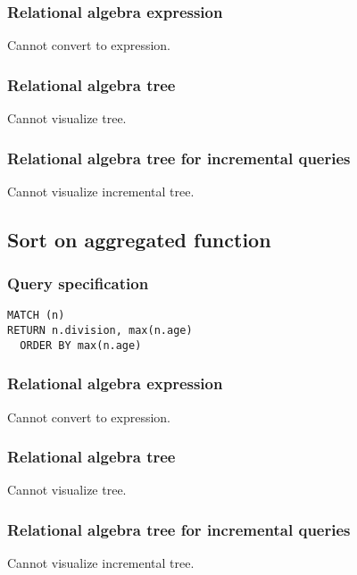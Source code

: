 \subsubsection*{Relational algebra expression}

Cannot convert to expression.

\subsubsection*{Relational algebra tree}

Cannot visualize tree.

\subsubsection*{Relational algebra tree for incremental queries}

Cannot visualize incremental tree.

\subsection{Sort on aggregated function}

\subsubsection*{Query specification}

\begin{lstlisting}
MATCH (n)
RETURN n.division, max(n.age)
  ORDER BY max(n.age)
\end{lstlisting}

\subsubsection*{Relational algebra expression}

Cannot convert to expression.

\subsubsection*{Relational algebra tree}

Cannot visualize tree.

\subsubsection*{Relational algebra tree for incremental queries}

Cannot visualize incremental tree.

